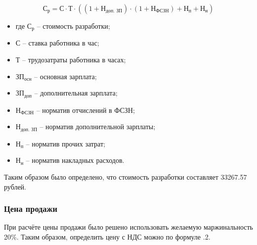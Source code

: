 \documentclass[14pt]{extarticle}
\renewcommand{\theequation}{\thesection.\arabic{equation}}
\begin{document}
\noindent
\begin{minipage}{1\linewidth}
\begin{equation}
  \text{С}_\text{р} = \text{С}⋅\text{Т}⋅((1 + \text{Н}_\text{доп.~ЗП})⋅(1 + \text{Н}_\text{ФСЗН}) + \text{Н}_\text{п} + \text{Н}_\text{н})
\end{equation}
\begin{itemize}[nosep, leftmargin=0pt, labelindent=0pt, itemsep=0pt, parsep=0pt]
  \item[] где $\text{С}_\text{р}$ -- стоимость разработки;
  \item[] \hspace*{12.5mm}С -- ставка работника в час;
  \item[] \hspace*{12.5mm}Т -- трудозатраты работника в часах;
  \item[] \hspace*{12.5mm}$\text{ЗП}_\text{осн}$ -- основная зарплата;
  \item[] \hspace*{12.5mm}$\text{ЗП}_\text{доп}$ -- дополнительная зарплата;
  \item[] \hspace*{12.5mm}$\text{Н}_\text{ФСЗН}$ -- норматив отчислений в ФСЗН;
  \item[] \hspace*{12.5mm}$\text{Н}_\text{доп.~ЗП}$ -- норматив дополнительной зарплаты;
  \item[] \hspace*{12.5mm}$\text{Н}_\text{п}$ -- норматив прочих затрат;
  \item[] \hspace*{12.5mm}$\text{Н}_\text{н}$ -- норматив накладных расходов.
\end{itemize}
\end{minipage}

Таким образом было определено, что стоимость разработки составляет 33267.57 рублей.

\subsubsection{Цена продажи}

При расчёте цены продажи было решено использовать желаемую маржинальность 20\%. Таким образом, определить цену с НДС можно по формуле \thesection.2.
\end{document}
